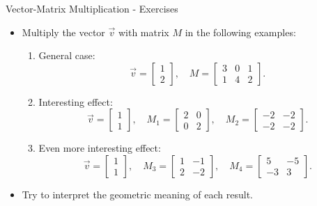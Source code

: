 \documentclass{beamer}
\begin{document}
\begin{frame}{Vector-Matrix Multiplication - Exercises}
  \begin{itemize}
    \item Multiply the vector $\vec{v}$ with matrix $M$ in the following examples:
    \begin{enumerate}
      \item General case:
      \begin{equation}
      \vec{v} = \begin{bmatrix} 1 \\ 2 \end{bmatrix},\quad
      M = \begin{bmatrix} 3 & 0 & 1 \\ 1 & 4 & 2 \end{bmatrix}.
      \end{equation}
      \item Interesting effect:
      \begin{equation}
      \vec{v} = \begin{bmatrix} 1 \\ 1 \end{bmatrix},\quad
      M_1 = \begin{bmatrix} 2 & 0 \\ 0 & 2 \end{bmatrix}, \quad
      M_2 = \begin{bmatrix} -2 & -2 \\ -2 & -2 \end{bmatrix}.
      \end{equation}
      \item Even more interesting effect:
      \begin{equation}
      \vec{v} = \begin{bmatrix} 1 \\ 1 \end{bmatrix},\quad
      M_3 = \begin{bmatrix} 1 & -1 \\ 2 & -2 \end{bmatrix}, \quad
      M_4 = \begin{bmatrix} 5 & -5 \\ -3 & 3 \end{bmatrix}.
      \end{equation}
    \end{enumerate}
    \item Try to interpret the geometric meaning of each result.
  \end{itemize}
\end{frame}
\end{document}
